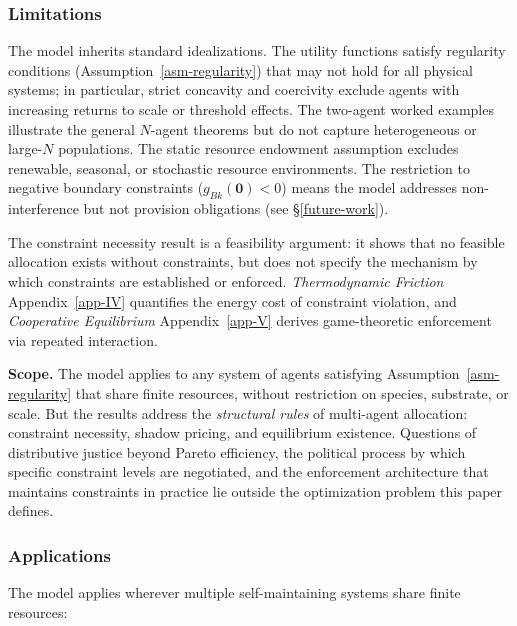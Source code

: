 \documentclass[11pt]{article}
\theoremstyle{plain}
\theoremstyle{definition}
\theoremstyle{remark}
\let\origsubsubsection\subsubsection
\renewcommand{\subsubsection}{\needspace{4\baselineskip}\origsubsubsection}
\begin{document}
\subsubsection{Limitations}\label{limitations}

The model inherits standard idealizations. The utility functions satisfy
regularity conditions (Assumption~\ref{asm-regularity}) that may not
hold for all physical systems; in particular, strict concavity and
coercivity exclude agents with increasing returns to scale or threshold
effects. The two-agent worked examples illustrate the general
\(N\)-agent theorems but do not capture heterogeneous or large-\(N\)
populations. The static resource endowment assumption excludes
renewable, seasonal, or stochastic resource environments. The
restriction to negative boundary constraints
(\(g_{Bk}(\mathbf{0}) < 0\)) means the model addresses non-interference
but not provision obligations (see §\ref{future-work}).

The constraint necessity result is a feasibility argument: it shows that
no feasible allocation exists without constraints, but does not specify
the mechanism by which constraints are established or enforced.
\emph{Thermodynamic Friction} Appendix~\ref{app-IV} quantifies the
energy cost of constraint violation, and \emph{Cooperative Equilibrium}
Appendix~\ref{app-V} derives game-theoretic enforcement via repeated
interaction.

\textbf{Scope.} The model applies to any system of agents satisfying
Assumption~\ref{asm-regularity} that share finite resources, without
restriction on species, substrate, or scale. But the results address the
\emph{structural rules} of multi-agent allocation: constraint necessity,
shadow pricing, and equilibrium existence. Questions of distributive
justice beyond Pareto efficiency, the political process by which
specific constraint levels are negotiated, and the enforcement
architecture that maintains constraints in practice lie outside the
optimization problem this paper defines.

\subsubsection{Applications}\label{applications}

The model applies wherever multiple self-maintaining systems share
finite resources:
\end{document}
